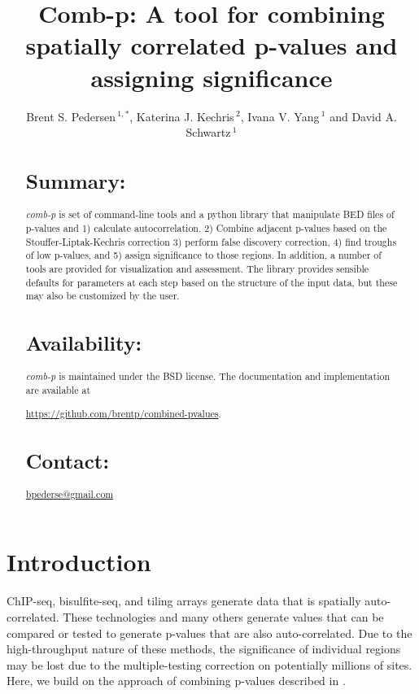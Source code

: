 \documentclass{bioinfo}
\begin{document}

\title[comb-p]{Comb-p: A tool for combining spatially correlated p-values and assigning significance}
\author[Pedersen \textit{et~al}]{Brent S. Pedersen\,$^{1,*}$, Katerina J. Kechris\,$^{2}$,
    Ivana V. Yang\,$^{1}$ and David A. Schwartz\,$^1$}
\address{$^{1}$Department of Medicine, University of Colorado, Denver, Anschutz Medical Campus, Aurora CO 80045, USA\\
$^{2}$Department of Statistics, University of Colorado, Denver, Anschutz Medical Campus, Aurora CO 80045, USA\\
}
\maketitle
\begin{abstract}

\section{Summary:}
\textit{comb-p} is set of command-line tools and a python library that
manipulate BED files of p-values and 1) calculate autocorrelation. 2) Combine
adjacent p-values based on the Stouffer-Liptak-Kechris correction \citep{Kechris2010}
3) perform false discovery correction, 4) find troughs of low p-values, and 5)
assign significance to those regions.
In addition, a number of tools are provided for visualization and
assessment. The library provides sensible defaults for parameters at each
step based on the structure of the input data, but these may also be customized
by the user.

\section{Availability:}
 \textit{comb-p} is maintained under the BSD license. The documentation and
 implementation are available at

 \href{https://github.com/brentp/combined-pvalues}{https://github.com/brentp/combined-pvalues}.
\section{Contact:} \href{bpederse@gmail.com}{bpederse@gmail.com}
\end{abstract}

\section{Introduction}
ChIP-seq, bisulfite-seq, and tiling arrays generate data that is spatially
auto-correlated. These technologies and many others generate values that can be
compared or tested to generate p-values that are also auto-correlated. Due to the
high-throughput nature of these methods, the significance of individual regions
may be lost due to the multiple-testing correction on potentially millions of sites.
Here, we build on the approach of combining p-values described in \citep{Kechris2010}.
\end{document}
